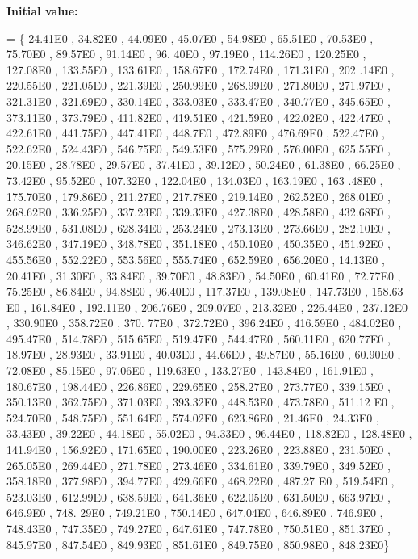 {\bfseries Initial value\+:}
\begin{DoxyCode}
= \{ 24.41E0 , 34.82E0 , 44.09E0 , 45.07E0 , 54.98E0 , 65.51E0 , 70.53E0 , 75.70E0 , 89.57E0 , 91.14E0 , 96.
      40E0 , 97.19E0 , 114.26E0 , 120.25E0 , 127.08E0 , 133.55E0 , 133.61E0 , 158.67E0 , 172.74E0 , 171.31E0 , 202
      .14E0 , 220.55E0 , 221.05E0 , 221.39E0 , 250.99E0 , 268.99E0 , 271.80E0 , 271.97E0 , 321.31E0 , 321.69E0 , 
      330.14E0 , 333.03E0 , 333.47E0 , 340.77E0 , 345.65E0 , 373.11E0 , 373.79E0 , 411.82E0 , 419.51E0 , 421.59E0 ,
       422.02E0 , 422.47E0 , 422.61E0 , 441.75E0 , 447.41E0 , 448.7E0  , 472.89E0 , 476.69E0 , 522.47E0 , 522.62E0
       , 524.43E0 , 546.75E0 , 549.53E0 , 575.29E0 , 576.00E0 , 625.55E0 , 20.15E0 , 28.78E0 , 29.57E0 , 37.41E0 ,
       39.12E0 , 50.24E0 , 61.38E0 , 66.25E0 , 73.42E0 , 95.52E0 , 107.32E0 , 122.04E0 , 134.03E0 , 163.19E0 , 163
      .48E0 , 175.70E0 , 179.86E0 , 211.27E0 , 217.78E0 , 219.14E0 , 262.52E0 , 268.01E0 , 268.62E0 , 336.25E0 , 
      337.23E0 , 339.33E0 , 427.38E0 , 428.58E0 , 432.68E0 , 528.99E0 , 531.08E0 , 628.34E0 , 253.24E0 , 273.13E0 ,
       273.66E0 ,
282.10E0 , 346.62E0 , 347.19E0 , 348.78E0 , 351.18E0 , 450.10E0 , 450.35E0 , 451.92E0 , 455.56E0 , 552.22E0
       , 553.56E0 , 555.74E0 , 652.59E0 , 656.20E0 , 14.13E0 , 20.41E0 , 31.30E0 , 33.84E0 , 39.70E0 , 48.83E0 , 
      54.50E0 , 60.41E0 , 72.77E0 , 75.25E0 , 86.84E0 , 94.88E0 , 96.40E0 , 117.37E0 , 139.08E0 , 147.73E0 , 158.63
      E0 , 161.84E0 , 192.11E0 , 206.76E0 , 209.07E0 , 213.32E0 , 226.44E0 , 237.12E0 , 330.90E0 , 358.72E0 , 370.
      77E0 , 372.72E0 , 396.24E0 , 416.59E0 , 484.02E0 , 495.47E0 , 514.78E0 , 515.65E0 , 519.47E0 , 544.47E0 , 
      560.11E0 , 620.77E0 , 18.97E0 , 28.93E0 , 33.91E0 , 40.03E0 , 44.66E0 , 49.87E0 , 55.16E0 , 60.90E0 , 72.08E0 
      , 85.15E0 , 97.06E0 , 119.63E0 , 133.27E0 , 143.84E0 , 161.91E0 , 180.67E0 , 198.44E0 , 226.86E0 , 229.65E0 
      , 258.27E0 , 273.77E0 , 339.15E0 , 350.13E0 , 362.75E0 , 371.03E0 , 393.32E0 , 448.53E0 , 473.78E0 , 511.12
      E0 , 524.70E0 , 548.75E0 , 551.64E0 , 574.02E0 , 623.86E0 , 21.46E0 , 24.33E0 , 33.43E0 , 39.22E0 , 44.18E0 ,
       55.02E0 , 94.33E0 , 96.44E0 , 118.82E0 , 128.48E0 ,
141.94E0 , 156.92E0 , 171.65E0 , 190.00E0 , 223.26E0 , 223.88E0 , 231.50E0 , 265.05E0 , 269.44E0 , 271.78E0
       , 273.46E0 , 334.61E0 , 339.79E0 , 349.52E0 , 358.18E0 , 377.98E0 , 394.77E0 , 429.66E0 , 468.22E0 , 487.27
      E0 , 519.54E0 , 523.03E0 , 612.99E0 , 638.59E0 , 641.36E0 , 622.05E0 , 631.50E0 , 663.97E0 , 646.9E0  , 748.
      29E0 , 749.21E0 , 750.14E0 , 647.04E0 , 646.89E0 , 746.9E0  , 748.43E0 , 747.35E0 , 749.27E0 , 647.61E0 , 
      747.78E0 , 750.51E0 , 851.37E0 , 845.97E0 , 847.54E0 , 849.93E0 , 851.61E0 , 849.75E0 , 850.98E0 , 848.23E0\}
\end{DoxyCode}


